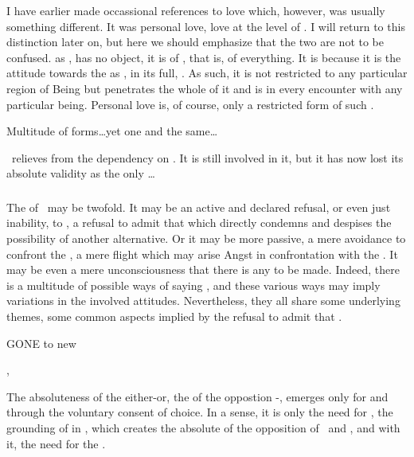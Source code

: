 {I
have earlier made occassional references to love which, however, was
usually something different.  It was personal love, love at the level
of .  I will return to this distinction later on, but here
we should emphasize that the two are not to be confused.   as
,  has no object, it is  of
, that is, of everything.  It is  because it
is the attitude towards the  as , in its full,
.  As such, it is not restricted to any
particular region of Being but penetrates the whole of it and is
 in every encounter with any particular being.  Personal
love is, of course, only a restricted form of such .

\pa
Multitude of forms\ldots yet one and the same\ldots

\pa
\yes\ relieves  from the dependency on . 
It is still involved in it, but it has now lost its absolute validity 
as the only \ldots
} %



\subsubsection{\No}
%
The  of \No\ may be twofold. It may be an active and 
declared refusal, or even just inability, to  \yes, a refusal to admit that  which directly condemns and despises the possibility of 
another alternative. Or it may be more passive, a mere avoidance to 
confront the , a mere flight which may arise Angst in 
confrontation with the . 
It may be even a mere unconsciousness that there is 
any  to be made. Indeed, there is a multitude 
of possible ways of saying \No, and these various ways may imply 
variations in the involved attitudes. Nevertheless, they all share 
some underlying themes, some common aspects implied by the refusal
to admit that .

GONE to new %

\sep

\pa
The absoluteness of the either-or, the  of the oppostion 
\yes-\No, emerges only for and through 
the voluntary consent of  choice. In a sense, it is 
only the  need for , the grounding of 
 in , which creates the 
absolute  of the opposition of \yes\ and \No, and with 
it, the need for the \sch.

